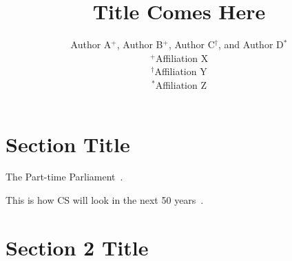 \documentclass[10pt]{article}
\title{\textbf{Title Comes Here}}
\author{Author A$^+$, Author B$^+$, Author C$^\dagger$, and Author D$^*$ \\
$^+$Affiliation X \\
$^\dagger$Affiliation Y\\
$^*$Affiliation Z
}
\date{}
\begin{document}
\maketitle

\begin{abstract}
\lipsum[1]
\end{abstract}


\section{Section Title}

\lipsum[2]
The Part-time Parliament~\cite{lamport:1998:paxos}.

\lipsum[3]
This is how CS will look in the next 50 years~\cite{mccarthy:2003:csprojections}.

\section{Section 2 Title}

\lipsum[4-8]



\end{document}
